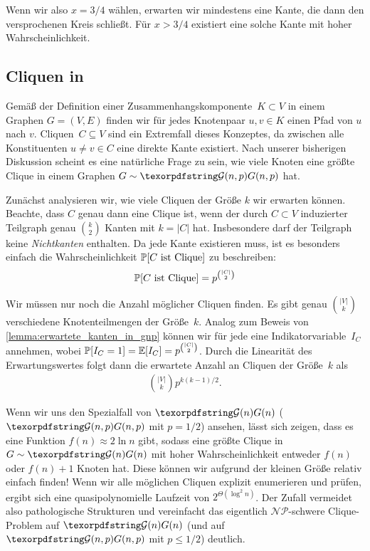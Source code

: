 Wenn wir also $x = 3/4$ wählen, erwarten wir mindestens eine Kante, die dann den versprochenen Kreis schließt.
Für $x > 3/4$ existiert eine solche Kante mit hoher Wahrscheinlichkeit.

\subsection{Cliquen in \Gnp}
Gemäß der Definition einer Zusammenhangskomponente~$K \subset V$ in einem Graphen $G=(V,E)$ finden wir für jedes Knotenpaar $u, v \in K$ einen Pfad von $u$ nach $v$.
Cliquen~$C \subseteq V$ sind ein Extremfall dieses Konzeptes, da zwischen alle Konstituenten $u \ne v \in C$ eine direkte Kante existiert.
Nach unserer bisherigen Diskussion scheint es eine natürliche Frage zu sein, wie viele Knoten eine größte Clique in einem Graphen $G \sim \Gnp$ hat.

Zunächst analysieren wir, wie viele Cliquen der Größe $k$ wir erwarten können.
Beachte, dass $C$ genau dann eine Clique ist, wenn der durch $C \subset V$ induzierter Teilgraph genau $\binom{k}{2}$ Kanten mit $k = |C|$ hat.
Insbesondere darf der Teilgraph keine \emph{Nichtkanten} enthalten.
Da jede Kante existieren muss, ist es besonders einfach die Wahrscheinlichkeit $\mathbb{P}\!\left[\text{$C$ ist Clique}\right]$ zu beschreiben:
\begin{align}
    \mathbb{P}\!\left[\text{$C$ ist Clique}\right] = p^{\binom{|C|}{2}}
\end{align}

Wir müssen nur noch die Anzahl möglicher Cliquen finden.
Es gibt genau $\binom{|V|}{k}$ verschiedene Knotenteilmengen der Größe~$k$.
Analog zum Beweis von \cref{lemma:erwartete_kanten_in_gnp} können wir für jede eine Indikatorvariable~$I_C$ annehmen, wobei $\mathbb{P}\!\left[I_C = 1\right] = \mathbb{E}\!\left[I_C\right] = p^{\binom{|C|}{2}}$.
Durch die Linearität des Erwartungswertes folgt dann die erwartete Anzahl an Cliquen der Größe~$k$ als
\begin{align}
    \binom{|V|}{k} p^{k(k-1)/2}.
\end{align}

Wenn wir uns den Spezialfall von $\Gn$ (\dh $\Gnp$ mit $p = 1/2$) ansehen, lässt sich zeigen, dass es eine Funktion $f(n) \approx 2\ln n$ gibt,
sodass eine größte Clique in $G \sim \Gn$ mit hoher Wahrscheinlichkeit entweder $f(n)$ oder $f(n)+1$ Knoten hat.
Diese können wir aufgrund der kleinen Größe relativ einfach finden!
Wenn wir alle möglichen Cliquen explizit enumerieren und prüfen, ergibt sich  eine quasipolynomielle Laufzeit von $2^{\Theta(\log^2 n)}$.
Der Zufall vermeidet also pathologische Strukturen und vereinfacht das eigentlich $\mathcal{NP}$-schwere Clique-Problem auf $\Gn$ (und auf $\Gnp$ mit $p \le 1/2$) deutlich.
